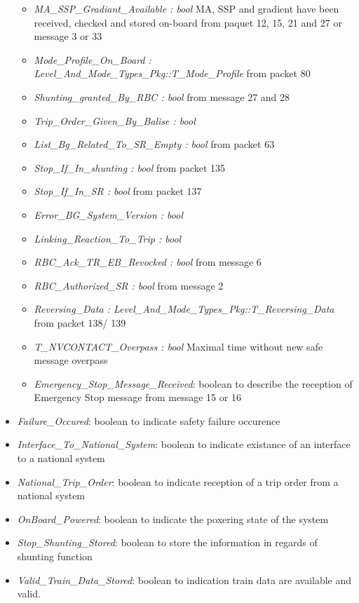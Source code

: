 \begin{itemize}
\begin{itemize}
\item \emph{MA\_SSP\_Gradiant\_Available : bool} MA, SSP and gradient have been received, checked and stored on-board from paquet 12, 15, 21 and 27 or message 3 or 33
\item \emph{Mode\_Profile\_On\_Board : Level\_And\_Mode\_Types\_Pkg::T\_Mode\_Profile} from packet 80
\item \emph{Shunting\_granted\_By\_RBC : bool} from message 27 and 28
\item \emph{Trip\_Order\_Given\_By\_Balise : bool}
\item \emph{List\_Bg\_Related\_To\_SR\_Empty : bool} from packet 63
\item \emph{Stop\_If\_In\_shunting : bool} from packet 135
\item \emph{Stop\_If\_In\_SR : bool} from packet 137
\item \emph{Error\_BG\_System\_Version : bool}
\item \emph{Linking\_Reaction\_To\_Trip : bool}
\item \emph{RBC\_Ack\_TR\_EB\_Revocked : bool} from message 6
\item \emph{RBC\_Authorized\_SR : bool} from message 2
\item \emph{Reversing\_Data : Level\_And\_Mode\_Types\_Pkg::T\_Reversing\_Data} from packet 138/ 139
\item \emph{T\_NVCONTACT\_Overpass : bool} Maximal time without new safe message overpass
\item \emph{Emergency\_Stop\_Message\_Received}: boolean to describe the reception of Emergency Stop message  from message 15 or 16
\end{itemize}
\item \emph{Failure\_Occured}: boolean to indicate safety failure occurence	
\item \emph{Interface\_To\_National\_System}: boolean to indicate existance of an interface to a national system 	  	
\item \emph{National\_Trip\_Order}: boolean to indicate reception of a trip order from a national system 	  	
\item \emph{OnBoard\_Powered}: boolean to indicate the poxering state of the system 	  	
\item \emph{Stop\_Shunting\_Stored}: boolean to store the information in regards of shunting function	  	
\item \emph{Valid\_Train\_Data\_Stored}: boolean to indication train data are available and valid.
\end{itemize}

